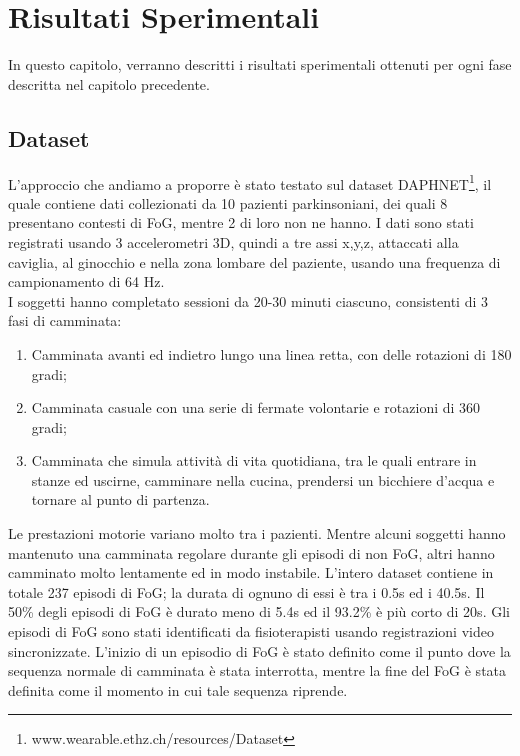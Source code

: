 
\chapter[Risultati Sperimentali]{Risultati Sperimentali}\label{chap6:result}
In questo capitolo, verranno descritti i risultati sperimentali ottenuti per ogni fase descritta nel capitolo precedente.

\section{Dataset}
L'approccio che andiamo a proporre è stato testato sul dataset DAPHNET\footnote{www.wearable.ethz.ch/resources/Dataset}, il quale contiene dati collezionati da 10 pazienti parkinsoniani, dei quali 8 presentano contesti di FoG, mentre 2 di loro non ne hanno. I dati sono stati registrati usando 3 accelerometri 3D, quindi a tre assi x,y,z, attaccati alla caviglia, al ginocchio e nella zona lombare del paziente, usando una frequenza di campionamento di 64 Hz.\\
I soggetti hanno completato sessioni da 20-30 minuti ciascuno, consistenti di 3 fasi di camminata:
\begin{enumerate}
	\item Camminata avanti ed indietro lungo una linea retta, con delle rotazioni di 180 gradi;
	\item Camminata casuale con una serie di fermate volontarie e rotazioni di 360 gradi;
	\item Camminata che simula attività di vita quotidiana, tra le quali entrare in stanze ed uscirne, camminare nella cucina, prendersi un bicchiere d'acqua e tornare al punto di partenza.
\end{enumerate}
Le prestazioni motorie variano molto tra i pazienti. Mentre alcuni soggetti hanno mantenuto una camminata regolare durante gli episodi di non FoG, altri hanno camminato molto lentamente ed in modo instabile. L'intero dataset contiene in totale 237 episodi di FoG; la durata di ognuno di essi è tra i 0.5s ed i 40.5s. Il 50\% degli episodi di FoG è durato meno di 5.4s ed il 93.2\% è più corto di 20s. Gli episodi di FoG sono stati identificati da fisioterapisti usando registrazioni video sincronizzate. L'inizio di un episodio di FoG è stato definito come il punto dove la sequenza normale di camminata è stata interrotta, mentre la fine del FoG è stata definita come il momento in cui tale sequenza riprende.

